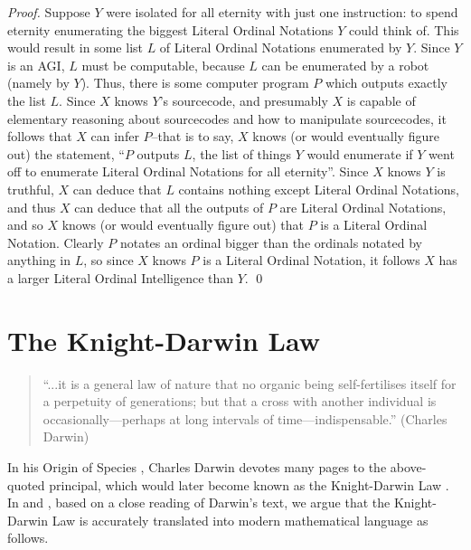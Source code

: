 \documentclass[runningheads]{llncs}
\begin{document}
\begin{proof}
    Suppose $Y$ were isolated for all eternity with just one instruction:
    to spend eternity enumerating the biggest Literal Ordinal Notations $Y$ could
    think of. This would result in some list $L$ of Literal Ordinal Notations
    enumerated by $Y$. Since $Y$ is an AGI, $L$ must be computable, because $L$ can
    be enumerated by a robot (namely by $Y$). Thus, there is some computer program
    $P$ which outputs exactly the list $L$. Since $X$ knows $Y$'s sourcecode,
    and presumably $X$ is capable of elementary reasoning about sourcecodes and
    how to manipulate sourcecodes, it follows that $X$ can infer $P$--that is to
    say, $X$ knows (or would eventually figure out) the statement, ``$P$ outputs
    $L$, the list of things $Y$ would enumerate if $Y$ went off to enumerate
    Literal Ordinal Notations for all eternity''. Since $X$ knows $Y$ is truthful,
    $X$ can deduce that $L$ contains nothing except Literal Ordinal Notations,
    and thus $X$ can deduce that all the outputs of $P$ are Literal Ordinal Notations,
    and so $X$ knows (or would eventually figure out) that $P$ is a Literal Ordinal Notation.
    Clearly $P$ notates an ordinal bigger than the ordinals notated by anything in $L$,
    so since $X$ knows $P$ is a Literal Ordinal Notation, it follows $X$ has a larger
    Literal Ordinal Intelligence than $Y$.
    \qed
\end{proof}

\section{The Knight-Darwin Law}
\label{knightdarwinagisection}

\begin{quote}
``...it is a general law of nature that no organic being self-fertilises itself
for a perpetuity of generations; but that a cross with another individual
is occasionally---perhaps at long intervals of time---indispensable.''
(Charles Darwin)
\end{quote}

In his Origin of Species \cite{originofspecies}, Charles Darwin devotes many
pages to the above-quoted principal, which would later become known as the
Knight-Darwin Law \cite{darwin1898knight}. In \cite{alexander2013} and
\cite{alexander2015alternative}, based on a close reading of Darwin's text, we argue
that the Knight-Darwin Law is accurately translated into modern mathematical
language as follows.
\end{document}

